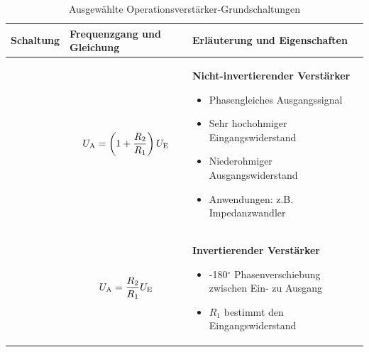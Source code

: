 \begin{table}[ht]
    \caption{Ausgewählte Operationsverstärker-Grundschaltungen}
    \label{tab:Grundschaltungen}
    \begin{tabular}{|m{}|m{}|m{}|}
        \hline
        Schaltung                                           & Frequenzgang und Gleichung           & Erläuterung und Eigenschaften \\ %
        \hline
        \vspace{0.5cm}
        \centering
         & 
        \vspace{1ex}
        \[
            U_{\textnormal{A}} = \left(1+\frac{R_2}{R_1}\right) U_{\textnormal{E}}
        \]
                                                            &
        \textbf{Nicht-invertierender Verstär\-ker}
        \index{Operationsverstärker>Nicht-invertierender Verstärker}
        \begin{itemize}[leftmargin=0.4cm, parsep=0.0cm, itemsep=2pt, topsep=2pt]
            \item Phasengleiches Ausgangs\-signal
            \item Sehr hochohmiger Eingangs\-wider\-stand
            \item Niederohmiger Ausgangs\-wider\-stand
            \item Anwendungen: z.B. Impedanzwandler
        \end{itemize}                                                    \\
        \hline
        \centering
        
                                                            &
        \begin{center}
            
        \end{center}
        \vspace{1ex}
        \[
            U_{\textnormal{A}} = \frac{R_2}{R_1} U_{\textnormal{E}}
        \]
                                                            &
        \textbf{Invertierender Verstärker}
        \index{Operationsverstärker>Invertierender Verstärker}
        \begin{itemize}[leftmargin=0.4cm, parsep=0.0cm, itemsep=2pt, topsep=2pt]
            \item -180$^\circ$ Phasenverschiebung zwischen Ein- zu Ausgang
            \item $R_1$ bestimmt den Eingangswiderstand

\end{itemize}
\end{tabular}
\end{table}
